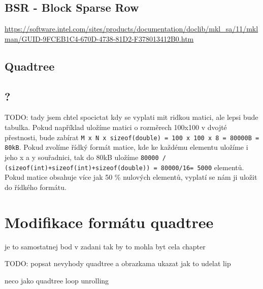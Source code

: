 \section{BSR - Block Sparse Row}

\url{https://software.intel.com/sites/products/documentation/doclib/mkl_sa/11/mklman/GUID-9FCEB1C4-670D-4738-81D2-F378013412B0.htm}



\section{Quadtree}

\section{?}

TODO: tady jsem chtel spocictat kdy  se vyplati mit ridkou matici, ale lepsi bude tabulka. Pokud například uložíme matici o rozměrech 100x100 v dvojté přestnosti, bude zabírat \texttt{M x N x sizeof(double) = 100 x 100 x 8 = 80000B = 80kB}. Pokud zvolíme řídký formát matice, kde ke každému elementu uložíme i jeho x a y souřadnici, tak do 80kB uložíme \texttt{80000 / (sizeof(int)+sizeof(int)+sizeof(double)) = 80000/16= 5000} elementů. Pokud matice obsahuje více jak 50  \% nulových elementů, vyplatí se nám ji uložit do řídkého formátu.


\chapter{Modifikace formátu quadtree}

je to samostatnej bod v zadani tak by to mohla byt cela chapter

TODO: popsat nevyhody quadtree a obrazkama ukazat jak to udelat lip

neco jako quadtree loop unrolling
